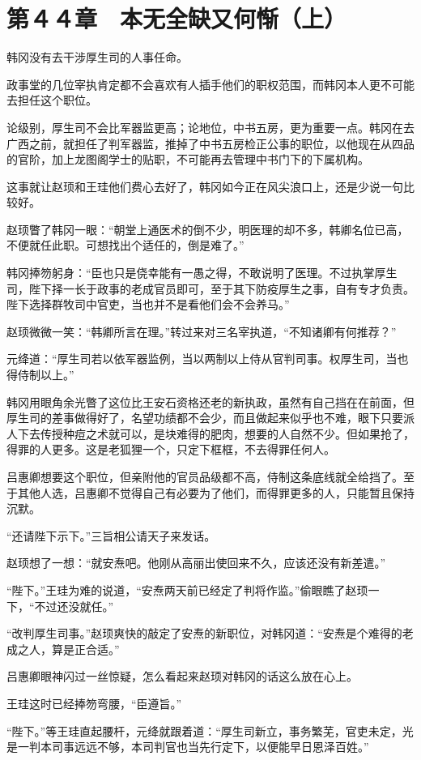 \section{第４４章　本无全缺又何惭（上）}

韩冈没有去干涉厚生司的人事任命。

政事堂的几位宰执肯定都不会喜欢有人插手他们的职权范围，而韩冈本人更不可能去担任这个职位。

论级别，厚生司不会比军器监更高；论地位，中书五房，更为重要一点。韩冈在去广西之前，就担任了判军器监，推掉了中书五房检正公事的职位，以他现在从四品的官阶，加上龙图阁学士的贴职，不可能再去管理中书门下的下属机构。

这事就让赵顼和王珪他们费心去好了，韩冈如今正在风尖浪口上，还是少说一句比较好。

赵顼瞥了韩冈一眼：“朝堂上通医术的倒不少，明医理的却不多，韩卿名位已高，不便就任此职。可想找出个适任的，倒是难了。”

韩冈捧笏躬身：“臣也只是侥幸能有一愚之得，不敢说明了医理。不过执掌厚生司，陛下择一长于政事的老成官员即可，至于其下防疫厚生之事，自有专才负责。陛下选择群牧司中官吏，当也并不是看他们会不会养马。”

赵顼微微一笑：“韩卿所言在理。”转过来对三名宰执道，“不知诸卿有何推荐？”

元绛道：“厚生司若以依军器监例，当以两制以上侍从官判司事。权厚生司，当也得侍制以上。”

韩冈用眼角余光瞥了这位比王安石资格还老的新执政，虽然有自己挡在在前面，但厚生司的差事做得好了，名望功绩都不会少，而且做起来似乎也不难，眼下只要派人下去传授种痘之术就可以，是块难得的肥肉，想要的人自然不少。但如果抢了，得罪的人更多。这是老狐狸一个，只定下框框，不去得罪任何人。

吕惠卿想要这个职位，但亲附他的官员品级都不高，侍制这条底线就全给挡了。至于其他人选，吕惠卿不觉得自己有必要为了他们，而得罪更多的人，只能暂且保持沉默。

“还请陛下示下。”三旨相公请天子来发话。

赵顼想了一想：“就安焘吧。他刚从高丽出使回来不久，应该还没有新差遣。”

“陛下。”王珪为难的说道，“安焘两天前已经定了判将作监。”偷眼瞧了赵顼一下，“不过还没就任。”

“改判厚生司事。”赵顼爽快的敲定了安焘的新职位，对韩冈道：“安焘是个难得的老成之人，算是正合适。”

吕惠卿眼神闪过一丝惊疑，怎么看起来赵顼对韩冈的话这么放在心上。

王珪这时已经捧笏弯腰，“臣遵旨。”

“陛下。”等王珪直起腰杆，元绛就跟着道：“厚生司新立，事务繁芜，官吏未定，光是一判本司事远远不够，本司判官也当先行定下，以便能早日恩泽百姓。”

